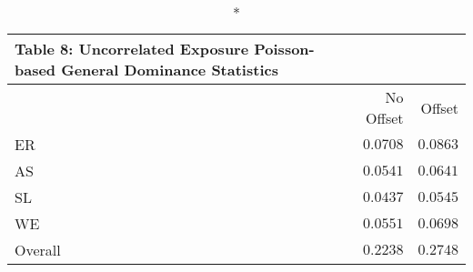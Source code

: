 \begin{longtable}{l|rr}
\caption*{
{\large Table 8: Uncorrelated Exposure Poisson-based General Dominance Statistics}
} \\ 
\toprule
\multicolumn{1}{l}{} & No Offset & Offset \\ 
\midrule
ER & $0.0708$ & $0.0863$ \\ 
AS & $0.0541$ & $0.0641$ \\ 
SL & $0.0437$ & $0.0545$ \\ 
WE & $0.0551$ & $0.0698$ \\ 
Overall & $0.2238$ & $0.2748$ \\ 
\bottomrule
\end{longtable}


